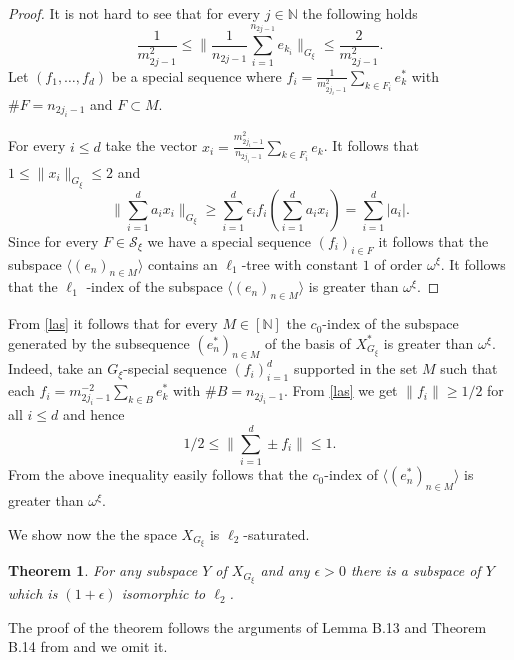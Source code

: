 \documentclass[a4paper]{amsart}
\theoremstyle{plain}
\newtheorem{theorem}{Theorem}[section]
\newcommand{\N}{\mathbb{N}}
\newcommand{\mc}{\mathcal}
\newcommand{\e}{\epsilon}
\newcommand{\norm}[1][\cdot]{\lVert #1\rVert}
\begin{document}
\begin{proof}
It is not hard to see that for every $j\in\N$ the following holds
\begin{equation}\label{las}\frac{1}{m_{2j-1}^{2}}\leq\|\frac{1}{n_{2j-1}}\sum_{i=1}^{n_{2j-1}}e_{k_i}\|_{G_\xi}\leq \frac{2}{m_{2j-1}^2}.
\end{equation}
Let  $(f_{1},\dots,f_{d})$ be a special sequence where
$f_{i}=\frac{1}{m_{2j_i-1}^{2}}\sum_{k\in F_{i}}e^{*}_{k}$ with $\# F=n_{2j_i-1}$ and
$F\subset M$.

For every $i\leq d$  take the vector $x_{i}=\frac{m_{2j_i-1}^{2}}{n_{2j_i-1}}\sum_{k\in
F_{i}}e_{k}$. It follows that $1\leq \norm[x_i]_{G_\xi}\leq 2$ and
$$
\|\sum_{i=1}^{d}a_{i}x_{i}\|_{G_\xi}\geq\sum_{i=1}^{d}\e_{i}f_{i}(\sum_{i=1}^{d}a_{i}x_{i})=\sum_{i=1}^{d}\vert a_i\vert.
$$
Since for every $F\in\mc{S}_{\xi}$ we have a special sequence $(f_{i})_{i\in F}$ it follows
that the   subspace  $\langle (e_{n})_{n\in M}\rangle$
contains  an $\ell_{1}$-tree with constant $1$ of order $\omega^{\xi}$. It follows that the  $\ell_{1}$ -index of the  subspace  $\langle (e_{n})_{n\in M}\rangle$ is greater than $\omega^{\xi}$.
\end{proof}
From \eqref{las} it follows that for every $M\in[\N]$ the $c_0$-index of the subspace
generated by the subsequence $(e_{n}^{*})_{n\in M}$ of the basis   of $X_{G_{\xi}}^{*}$
is  greater than $\omega^{\xi}$.   Indeed, take an $G_{\xi}$-special  sequence
$(f_{i})_{i=1}^{d}$ supported in the set $M$ such that each
$f_{i}=m_{2j_{i}-1}^{-2}\sum_{k\in B}e_{k}^{*}$ with  $\# B=n_{2j_{i}-1}$.  From
\eqref{las} we get  $\norm[f_{i}]\geq 1/2$ for all $i\leq d$ and hence
$$1/2\leq \|\sum_{i=1}^{d}\pm f_{i}\|\leq 1.
$$
From the above inequality easily follows that the $c_0$-index  of $\langle
(e_{n}^{*})_{n\in M}\rangle$  is greater than $\omega^{\xi}$.


We show now the the space $X_{G_{\xi}}$ is $\ell_{2}$-saturated.
\begin{theorem}
For any subspace $Y$ of $X_{G_{\xi}}$ and any $\e>0$ there is a subspace of $Y$ which is
$(1+\e)$ isomorphic to $\ell_2$.
\end{theorem}
The  proof of the theorem  follows the arguments of Lemma B.13 and Theorem B.14  from \cite{AAT} and we omit it.
\end{document}
